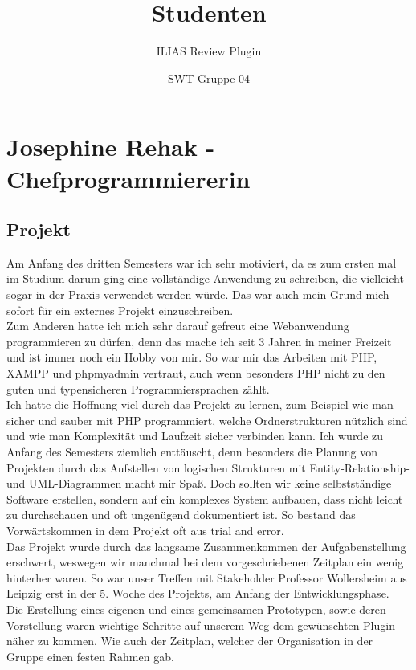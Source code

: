 \documentclass[a4paper]{scrreprt}
\begin{document}
 
\title{Studenten}
\subtitle{ILIAS Review Plugin}
\author{SWT-Gruppe 04}
\maketitle

\tableofcontents

\chapter{Josephine Rehak - Chefprogrammiererin}
\section{Projekt}
Am Anfang des dritten Semesters war ich sehr motiviert, da es zum ersten mal im Studium darum ging eine vollständige Anwendung zu schreiben, die vielleicht sogar in der Praxis verwendet werden würde. Das war auch mein Grund mich sofort für ein externes Projekt einzuschreiben.\\
Zum Anderen hatte ich mich sehr darauf gefreut eine Webanwendung programmieren zu dürfen, denn das mache ich seit 3 Jahren in meiner Freizeit und ist immer noch ein Hobby von mir. So war mir das Arbeiten mit PHP, XAMPP und phpmyadmin vertraut, auch wenn besonders PHP nicht zu den guten und typensicheren Programmiersprachen zählt.
\\
 Ich hatte die Hoffnung viel durch das Projekt zu lernen, zum Beispiel wie man sicher  und sauber mit PHP programmiert, welche Ordnerstrukturen nützlich sind und wie man Komplexität und Laufzeit sicher verbinden kann.
Ich wurde zu Anfang des Semesters ziemlich enttäuscht, denn besonders die Planung von Projekten durch das Aufstellen von logischen Strukturen mit Entity-Relationship- und UML-Diagrammen macht mir Spaß. Doch sollten wir keine selbstständige Software erstellen, sondern auf ein komplexes System aufbauen, dass nicht leicht zu durchschauen und oft ungenügend dokumentiert ist. So bestand das Vorwärtskommen in dem Projekt oft aus trial and error. \\
Das Projekt wurde durch das langsame Zusammenkommen der Aufgabenstellung erschwert, weswegen wir manchmal bei dem vorgeschriebenen Zeitplan ein wenig hinterher waren. So war unser Treffen mit Stakeholder Professor Wollersheim aus Leipzig erst in der 5. Woche des Projekts, am Anfang der Entwicklungsphase. \\
Die Erstellung eines eigenen und eines gemeinsamen Prototypen, sowie deren Vorstellung waren wichtige Schritte auf unserem Weg dem gewünschten Plugin näher zu kommen. Wie auch der Zeitplan, welcher der Organisation in der Gruppe einen festen Rahmen gab.  
\end{document}
